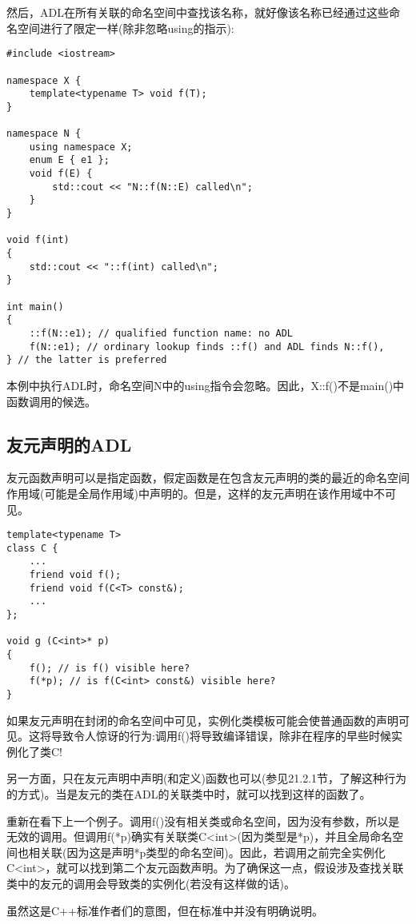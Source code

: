 然后，ADL在所有关联的命名空间中查找该名称，就好像该名称已经通过这些命名空间进行了限定一样(除非忽略using的指示):

\begin{lstlisting}[style=styleCXX]
#include <iostream>

namespace X {
	template<typename T> void f(T);
}

namespace N {
	using namespace X;
	enum E { e1 };
	void f(E) {
		std::cout << "N::f(N::E) called\n";
	}
}

void f(int)
{
	std::cout << "::f(int) called\n";
}

int main()
{
	::f(N::e1); // qualified function name: no ADL
	f(N::e1); // ordinary lookup finds ::f() and ADL finds N::f(),
} // the latter is preferred
\end{lstlisting}

本例中执行ADL时，命名空间N中的using指令会忽略。因此，X::f()不是main()中函数调用的候选。

\subsection{友元声明的ADL}

友元函数声明可以是指定函数，假定函数是在包含友元声明的类的最近的命名空间作用域(可能是全局作用域)中声明的。但是，这样的友元声明在该作用域中不可见。

\begin{lstlisting}[style=styleCXX]
template<typename T>
class C {
	...
	friend void f();
	friend void f(C<T> const&);
	...
};

void g (C<int>* p)
{
	f(); // is f() visible here?
	f(*p); // is f(C<int> const&) visible here?
}
\end{lstlisting}

如果友元声明在封闭的命名空间中可见，实例化类模板可能会使普通函数的声明可见。这将导致令人惊讶的行为:调用f()将导致编译错误，除非在程序的早些时候实例化了类C!

另一方面，只在友元声明中声明(和定义)函数也可以(参见21.2.1节，了解这种行为的方式)。当是友元的类在ADL的关联类中时，就可以找到这样的函数了。

重新在看下上一个例子。调用f()没有相关类或命名空间，因为没有参数，所以是无效的调用。但调用f(*p)确实有关联类C<int>(因为类型是*p)，并且全局命名空间也相关联(因为这是声明*p类型的命名空间)。因此，若调用之前完全实例化C<int>，就可以找到第二个友元函数声明。为了确保这一点，假设涉及查找关联类中的友元的调用会导致类的实例化(若没有这样做的话)。

\begin{tcolorbox}[colback=webgreen!5!white,colframe=webgreen!75!black]
\hspace*{0.75cm}虽然这是C++标准作者们的意图，但在标准中并没有明确说明。
\end{tcolorbox}

